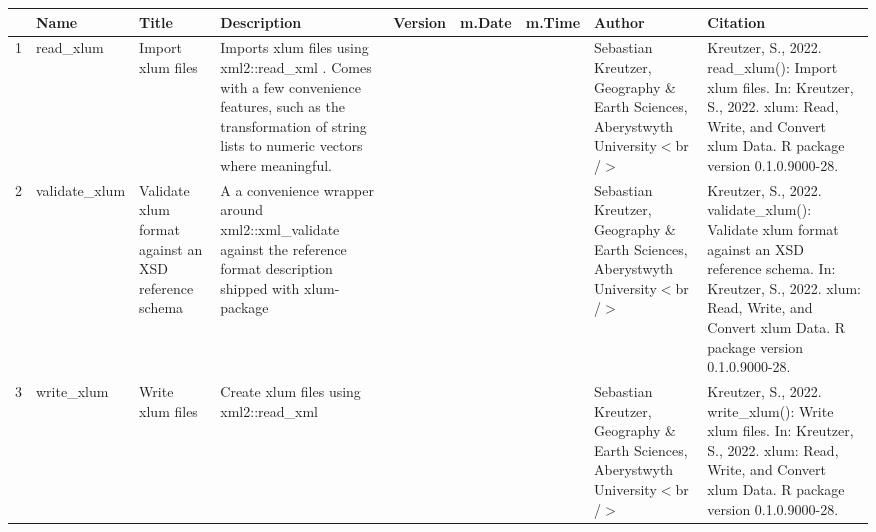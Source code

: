 \begin{table}[ht]
\centering
\begin{tabular}{rllllllll}
  \hline
 & Name & Title & Description & Version & m.Date & m.Time & Author & Citation \\ 
  \hline
1 & read\_xlum & Import xlum files & Imports xlum files using  xml2::read\_xml . Comes with a few convenience features, such as the transformation of string lists to numeric vectors where meaningful. &  &  &  & Sebastian Kreutzer, Geography \& Earth Sciences, Aberystwyth University$<$br /$>$ & Kreutzer, S., 2022. read\_xlum(): Import xlum files. In: Kreutzer, S., 2022. xlum: Read, Write, and Convert xlum Data. R package version 0.1.0.9000-28. 
 \\ 
  2 & validate\_xlum & Validate xlum format against an XSD reference schema & A a convenience wrapper around  xml2::xml\_validate  against the reference format description shipped with  xlum-package &  &  &  & Sebastian Kreutzer, Geography \& Earth Sciences, Aberystwyth University$<$br /$>$ & Kreutzer, S., 2022. validate\_xlum(): Validate xlum format against an XSD reference schema. In: Kreutzer, S., 2022. xlum: Read, Write, and Convert xlum Data. R package version 0.1.0.9000-28. 
 \\ 
  3 & write\_xlum & Write xlum files & Create xlum files using  xml2::read\_xml &  &  &  & Sebastian Kreutzer, Geography \& Earth Sciences, Aberystwyth University$<$br /$>$ & Kreutzer, S., 2022. write\_xlum(): Write xlum files. In: Kreutzer, S., 2022. xlum: Read, Write, and Convert xlum Data. R package version 0.1.0.9000-28. 
 \\ 
   \hline
\end{tabular}
\end{table}

